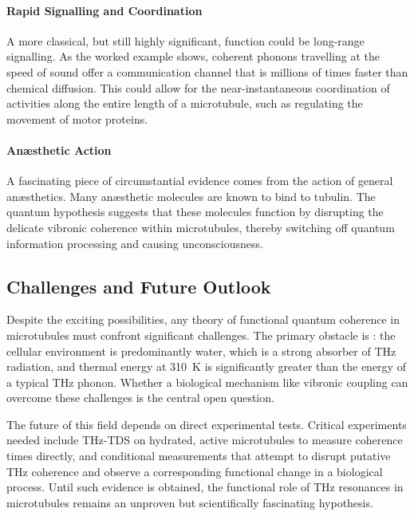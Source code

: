 \paragraph{Rapid Signalling and Coordination}
A more classical, but still highly significant, function could be long-range signalling. As the worked example shows, coherent phonons travelling at the speed of sound offer a communication channel that is millions of times faster than chemical diffusion. This could allow for the near-instantaneous coordination of activities along the entire length of a microtubule, such as regulating the movement of motor proteins.

\paragraph{Anæsthetic Action}
A fascinating piece of circumstantial evidence comes from the action of general anæsthetics. Many anæsthetic molecules are known to bind to tubulin. The quantum hypothesis suggests that these molecules function by disrupting the delicate vibronic coherence within microtubules, thereby switching off quantum information processing and causing unconsciousness.

\subsection{Challenges and Future Outlook}

Despite the exciting possibilities, any theory of functional quantum coherence in microtubules must confront significant challenges. The primary obstacle is : the cellular environment is predominantly water, which is a strong absorber of THz radiation, and thermal energy at 310~K is significantly greater than the energy of a typical THz phonon. Whether a biological mechanism like vibronic coupling can overcome these challenges is the central open question.

The future of this field depends on direct experimental tests. Critical experiments needed include THz-TDS on hydrated, active microtubules to measure coherence times directly, and conditional measurements that attempt to disrupt putative THz coherence and observe a corresponding functional change in a biological process. Until such evidence is obtained, the functional role of THz resonances in microtubules remains an unproven but scientifically fascinating hypothesis.

